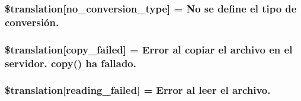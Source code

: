 \subsubsection[{\$translation}]{\setlength{\rightskip}{0pt plus 5cm}\$translation\mbox{[}\textquotesingle{}no\+\_\+conversion\+\_\+type\textquotesingle{}\mbox{]} = \textquotesingle{}No se define el tipo de conversión.\textquotesingle{}}\label{class_8upload_8es___e_s_8php_a4712d7ec28e9a7f17eb3338af2358363}
\hypertarget{class_8upload_8es___e_s_8php_a783c9358bcf54a054545b50098bc679b}{}
\subsubsection[{\$translation}]{\setlength{\rightskip}{0pt plus 5cm}\$translation\mbox{[}\textquotesingle{}copy\+\_\+failed\textquotesingle{}\mbox{]} = \textquotesingle{}Error al copiar el archivo en el servidor. copy() ha fallado.\textquotesingle{}}\label{class_8upload_8es___e_s_8php_a783c9358bcf54a054545b50098bc679b}
\hypertarget{class_8upload_8es___e_s_8php_a01bea14c9fd5f353f62db44beabfcd42}{}
\subsubsection[{\$translation}]{\setlength{\rightskip}{0pt plus 5cm}\$translation\mbox{[}\textquotesingle{}reading\+\_\+failed\textquotesingle{}\mbox{]} = \textquotesingle{}Error al leer el archivo.\textquotesingle{}}\label{class_8upload_8es___e_s_8php_a01bea14c9fd5f353f62db44beabfcd42}
